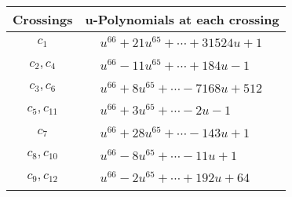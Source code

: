 \documentclass[1p]{elsarticle_modified}
\theoremstyle{definition}
\begin{document}
\begin{tabular}{m{50pt}|m{274pt}}
Crossings & \hspace{64pt}u-Polynomials at each crossing \\
\hline $$\begin{aligned}c_{1}\end{aligned}$$&$\begin{aligned}
&u^{66}+21 u^{65}+\cdots+31524 u+1
\end{aligned}$\\
\hline $$\begin{aligned}c_{2},c_{4}\end{aligned}$$&$\begin{aligned}
&u^{66}-11 u^{65}+\cdots+184 u-1
\end{aligned}$\\
\hline $$\begin{aligned}c_{3},c_{6}\end{aligned}$$&$\begin{aligned}
&u^{66}+8 u^{65}+\cdots-7168 u+512
\end{aligned}$\\
\hline $$\begin{aligned}c_{5},c_{11}\end{aligned}$$&$\begin{aligned}
&u^{66}+3 u^{65}+\cdots-2 u-1
\end{aligned}$\\
\hline $$\begin{aligned}c_{7}\end{aligned}$$&$\begin{aligned}
&u^{66}+28 u^{65}+\cdots-143 u+1
\end{aligned}$\\
\hline $$\begin{aligned}c_{8},c_{10}\end{aligned}$$&$\begin{aligned}
&u^{66}-8 u^{65}+\cdots-11 u+1
\end{aligned}$\\
\hline $$\begin{aligned}c_{9},c_{12}\end{aligned}$$&$\begin{aligned}
&u^{66}-2 u^{65}+\cdots+192 u+64
\end{aligned}$\\
\hline
\end{tabular}\\~\\
\newpage\renewcommand{\arraystretch}{1}
\end{document}
